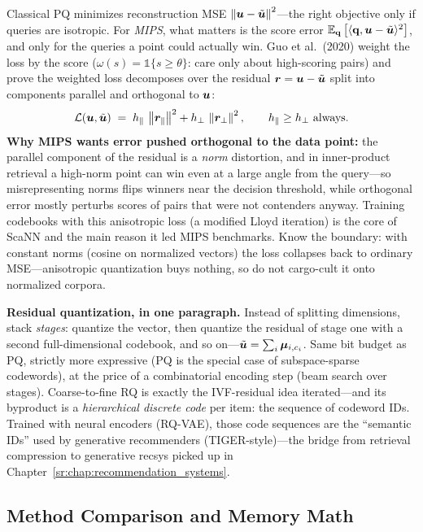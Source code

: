 Classical PQ minimizes reconstruction MSE $\left\lVert\bm{u} - \tilde{\bm{u}}\right\rVert^2$---the right objective only if queries are isotropic. For \emph{MIPS}, what matters is the score error $\operatorname{\mathbb{E}}_{\mathbf{q}}\big[\langle\mathbf{q},\bm{u} - \tilde{\bm{u}}\rangle^2\big]$, and only for the queries a point could actually win. Guo et al.\ (2020) weight the loss by the score ($\omega(s) = \mathds{1}\{s \ge \theta\}$: care only about high-scoring pairs) and prove the weighted loss decomposes over the residual $\bm{r} = \bm{u} - \tilde{\bm{u}}$ split into components parallel and orthogonal to $\bm{u}$:
\begin{equation}
\mathcal{L}(\bm{u}, \tilde{\bm{u}}) \;=\; h_{\parallel} \, \left\lVert\bm{r}_{\parallel}\right\rVert^2 + h_{\perp} \, \left\lVert\bm{r}_{\perp}\right\rVert^2,
\qquad h_{\parallel} \ge h_{\perp} \text{ always}.
\end{equation}
\textbf{Why MIPS wants error pushed orthogonal to the data point:} the parallel component of the residual is a \emph{norm} distortion, and in inner-product retrieval a high-norm point can win even at a large angle from the query---so misrepresenting norms flips winners near the decision threshold, while orthogonal error mostly perturbs scores of pairs that were not contenders anyway. Training codebooks with this anisotropic loss (a modified Lloyd iteration) is the core of ScaNN and the main reason it led MIPS benchmarks. Know the boundary: with constant norms (cosine on normalized vectors) the loss collapses back to ordinary MSE---anisotropic quantization buys nothing, so do not cargo-cult it onto normalized corpora.

\textbf{Residual quantization, in one paragraph.} Instead of splitting dimensions, stack \emph{stages}: quantize the vector, then quantize the residual of stage one with a second full-dimensional codebook, and so on---$\tilde{\bm{u}} = \sum_i \bm{\mu}_{i, c_i}$. Same bit budget as PQ, strictly more expressive (PQ is the special case of subspace-sparse codewords), at the price of a combinatorial encoding step (beam search over stages). Coarse-to-fine RQ is exactly the IVF-residual idea iterated---and its byproduct is a \emph{hierarchical discrete code} per item: the sequence of codeword IDs. Trained with neural encoders (RQ-VAE), those code sequences are the ``semantic IDs'' used by generative recommenders (TIGER-style)---the bridge from retrieval compression to generative recsys picked up in Chapter~\ref{sr:chap:recommendation_systems}.

\subsection{Method Comparison and Memory Math}

